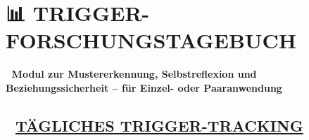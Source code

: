 %


\hypertarget{trigger-forschungstagebuch}{%
\section{\texorpdfstring{📊 \textbf{TRIGGER-FORSCHUNGSTAGEBUCH} }{📊 TRIGGER-FORSCHUNGSTAGEBUCH }}\label{trigger-forschungstagebuch}}

🧩 \textbf{Modul zur Mustererkennung, Selbstreflexion und Beziehungssicherheit -- für Einzel- oder Paaranwendung}

\hypertarget{tuxe4gliches-trigger-tracking}{%
\subsection{\texorpdfstring{📆 \textbf{\ul{TÄGLICHES TRIGGER-TRACKING}}}{📆 TÄGLICHES TRIGGER-TRACKING}}\label{tuxe4gliches-trigger-tracking}}

